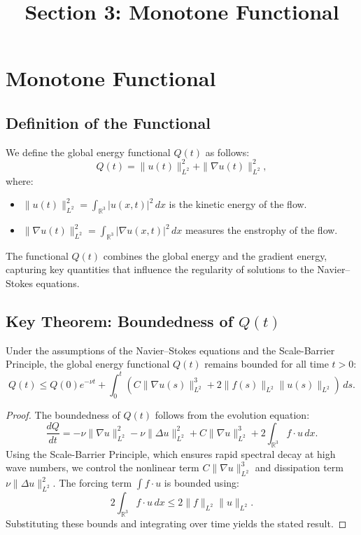 \documentclass[12pt]{article}
\theoremstyle{definition}
\begin{document}
\title{Section 3: Monotone Functional}
\author{}
\date{}
\maketitle

\section{Monotone Functional}

\subsection{Definition of the Functional}
We define the global energy functional $Q(t)$ as follows:
\[
Q(t) = \|u(t)\|_{L^2}^2 + \|\nabla u(t)\|_{L^2}^2,
\]
where:
\begin{itemize}
    \item $\|u(t)\|_{L^2}^2 = \int_{\mathbb{R}^3} |u(x,t)|^2 \, dx$ is the kinetic energy of the flow.
    \item $\|\nabla u(t)\|_{L^2}^2 = \int_{\mathbb{R}^3} |\nabla u(x,t)|^2 \, dx$ measures the enstrophy of the flow.
\end{itemize}

The functional $Q(t)$ combines the global energy and the gradient energy, capturing key quantities that influence the regularity of solutions to the Navier--Stokes equations.

\subsection{Key Theorem: Boundedness of $Q(t)$}
\begin{theorem}
Under the assumptions of the Navier--Stokes equations and the Scale-Barrier Principle, the global energy functional $Q(t)$ remains bounded for all time $t > 0$:
\[
Q(t) \leq Q(0) e^{-\nu t} + \int_0^t \left( C \|\nabla u(s)\|_{L^2}^3 + 2 \|f(s)\|_{L^2}\|u(s)\|_{L^2} \right) \, ds.
\]
\end{theorem}

\begin{proof}
The boundedness of $Q(t)$ follows from the evolution equation:
\[
\frac{dQ}{dt} = -\nu \|\nabla u\|_{L^2}^2 - \nu \|\Delta u\|_{L^2}^2 + C \|\nabla u\|_{L^2}^3 + 2 \int_{\mathbb{R}^3} f \cdot u \, dx.
\]
Using the Scale-Barrier Principle, which ensures rapid spectral decay at high wave numbers, we control the nonlinear term $C \|\nabla u\|_{L^2}^3$ and dissipation term $\nu \|\Delta u\|_{L^2}^2$. The forcing term $\int f \cdot u$ is bounded using:
\[
2 \int_{\mathbb{R}^3} f \cdot u \, dx \leq 2 \|f\|_{L^2}\|u\|_{L^2}.
\]
Substituting these bounds and integrating over time yields the stated result.
\end{proof}
\end{document}
